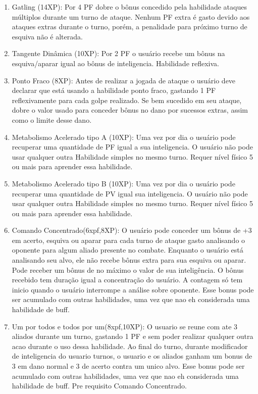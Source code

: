 \begin{enumerate}
	\item Gatling (14XP): Por 4 PF dobre o bônus concedido pela habilidade ataques múltiplos durante um turno de ataque. Nenhum PF extra é gasto devido aos ataques extras durante o turno, porém, a penalidade para próximo turno de esquiva não é alterada.	

	\item Tangente Dinâmica (10XP): Por 2 PF o usuário recebe um bônus na esquiva/aparar igual ao bônus de inteligencia. Habilidade reflexiva.

	\item Ponto Fraco (8XP): Antes de realizar a jogada de ataque o usuário deve declarar que está usando a habilidade ponto fraco, gastando 1 PF reflexivamente para cada golpe realizado. Se bem sucedido em seu ataque, dobre o valor usado para conceder bônus no dano por sucessos extras, assim como o limite desse dano.
 
	\item Metabolismo Acelerado tipo A (10XP): Uma vez por dia o usuário pode recuperar uma quantidade de PF igual a sua inteligencia. O usuário não pode usar qualquer outra Habilidade simples no mesmo turno. Requer nível físico 5 ou mais para aprender essa habilidade. 

	\item Metabolismo Acelerado tipo B (10XP): Uma vez por dia o usuário pode recuperar uma quantidade de PV igual sua inteligencia. O usuário não pode usar qualquer outra Habilidade simples no mesmo turno. Requer nível físico 5 ou mais para aprender essa habilidade. 
 	 
	\item Comando Concentrado(6xpf,8XP): O usuário pode conceder um bônus de +3 em acerto, esquiva ou aparar para cada turno de ataque gasto analisando o oponente para algum aliado presente no combate. Enquanto o usuário está analisando seu alvo, ele não recebe bônus extra para sua esquiva ou aparar. Pode receber um bônus de no máximo o valor de sua inteligência. O bônus recebido tem duração igual a concentração do usuário. A contagem só tem inicio quando o usuário interrompe a análise sobre oponente. Esse bonus pode ser acumulado com outras habilidades, uma vez que nao eh considerada uma habilidade de buff.
 
 	\item Um por todos e todos por um(8xpf,10XP): O usuario se reune com ate 3 aliados durante um turno, gastando 1 PF e sem poder realizar qualquer outra acao durante o uso dessa habilidade. Ao final do turno, durante modificador de inteligencia do usuario turnos, o usuario e os aliados ganham um bonus de 3 em dano normal e 3 de acerto contra um unico alvo.  Esse bonus pode ser acumulado com outras habilidades, uma vez que nao eh considerada uma habilidade de buff. Pre requisito Comando Concentrado.
 	

\end{enumerate}
